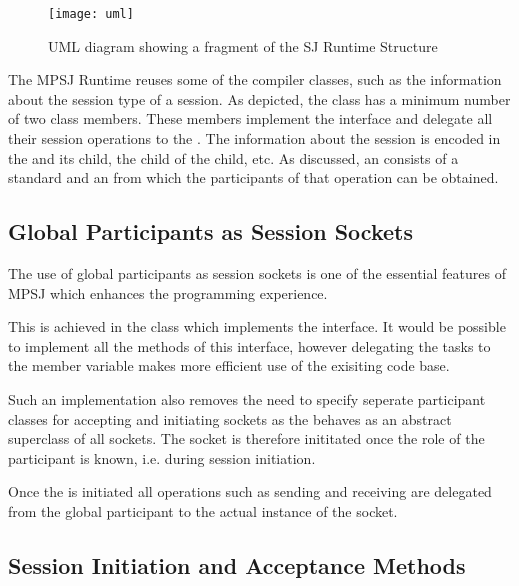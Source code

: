 \begin{figure}[H]
\begin{center}
\texttt{[image: uml]}
\caption{UML diagram showing a fragment of the SJ Runtime Structure}
\label{fig:runtimeuml}
\end{center}
\end{figure}

The MPSJ Runtime reuses some of the compiler classes, such as the information about the session type of a session. As depicted, the  class has a minimum number of two  class members. These members implement the  interface and delegate all their session operations to the . The information about the session is encoded in the  and its child, the child of the child, etc. As discussed, an  consists of a standard  and an  from which the participants of that operation can be obtained.


\subsection{Global Participants as Session Sockets}

The use of global participants as session sockets is one of the essential features of MPSJ which enhances the programming experience.

This is achieved in the class  which implements the  interface. It would be possible to implement all the methods of this interface, however delegating the tasks to the  member variable makes more efficient use of the exisiting code base.

Such an implementation also removes the need to specify seperate participant classes for accepting and initiating sockets as the  behaves as an abstract superclass of all sockets. The socket is therefore inititated once the role of the participant is known, i.e. during session initiation.

Once the  is initiated all operations such as sending and receiving are delegated from the global participant to the actual instance of the socket.

\subsection{Session Initiation and Acceptance Methods}

